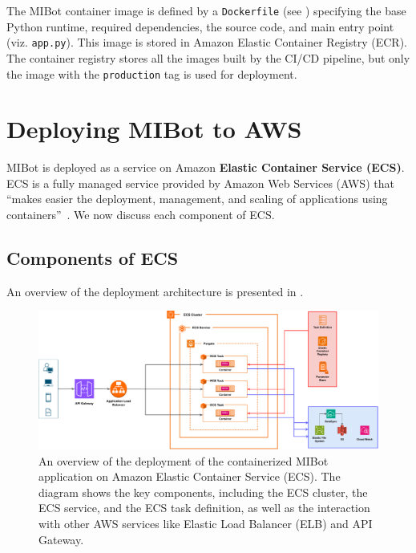The MIBot container image is defined by a \texttt{Dockerfile} (see ) specifying the base Python runtime, required dependencies, the source code, and main entry point (viz. \texttt{app.py}). This image is stored in Amazon Elastic Container Registry (ECR). The container registry stores all the images built by the CI/CD pipeline, but only the image with the \texttt{production} tag is used for deployment.

\section{Deploying MIBot to AWS}
\label{sec:mibot-deployment}

MIBot is deployed as a service on Amazon \textbf{Elastic Container Service (ECS)}. ECS is a fully managed service provided by Amazon Web Services (AWS) that ``makes easier the deployment, management, and scaling of applications using containers''~\citep{aws-ecs-getting-started}. We now discuss each component of ECS.

\subsection{Components of ECS}
An overview of the deployment architecture is presented in .
\begin{figure}[ht]
	\centering
	\includegraphics[width=0.99\linewidth]{fig/deployment.drawio.pdf}
	\caption[MIBot Deployment on AWS ECS]{An overview of the deployment of the containerized MIBot application on Amazon Elastic Container Service (ECS). The diagram shows the key components, including the ECS cluster, the ECS service, and the ECS task definition, as well as the interaction with other AWS services like Elastic Load Balancer (ELB) and API Gateway.}
	\label{fig:ecs-components}
\end{figure}

